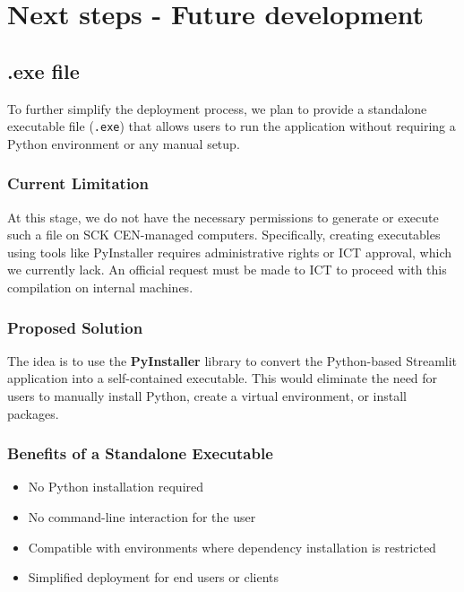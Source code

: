 \documentclass[11pt,a4paper]{report}
\begin{document}
\chapter{Next steps - Future development}

\section{.exe file}

To further simplify the deployment process, we plan to provide a standalone executable file (\texttt{.exe}) that allows users to run the application without requiring a Python environment or any manual setup.

\subsection*{Current Limitation}

At this stage, we do not have the necessary permissions to generate or execute such a file on SCK CEN-managed computers. Specifically, creating executables using tools like PyInstaller requires administrative rights or ICT approval, which we currently lack. An official request must be made to ICT to proceed with this compilation on internal machines.

\subsection*{Proposed Solution}

The idea is to use the \textbf{PyInstaller} library to convert the Python-based Streamlit application into a self-contained executable. This would eliminate the need for users to manually install Python, create a virtual environment, or install packages.

\subsection*{Benefits of a Standalone Executable}

\begin{itemize}
    \item No Python installation required
    \item No command-line interaction for the user
    \item Compatible with environments where dependency installation is restricted
    \item Simplified deployment for end users or clients
\end{itemize}
\end{document}
